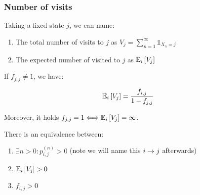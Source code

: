  \begin{frame} \frametitle{Number of visits}
    \vspace{2em}
    
    \begin{definition}
    Taking a fixed state $j$, we can name:
    \begin{enumerate}
     \item The total number of visits to $j$  as $V_j = \sum_{n = 1}^{\infty} \mathds{1}_{X_n = j}$
     \item The expected number of visited to $j$  as $\mathbb{E}_i\left[{V_j}\right]$
    \end{enumerate}
    \end{definition}
    
    \begin{proposition}
    If $f_{j,j} \neq 1$, we have:

    \[
    \mathbb{E}_i\left[{V_j}\right] = \frac{f_{i,j}}{1 - f_{j,j}}
    \]

    Moreover, it holds $f_{j, j} = 1 \Longleftrightarrow \mathbb{E}_i\left[{V_j}\right] = \infty$.
    \end{proposition}
    
    \begin{proposition}
    There is an equivalence between:
    \begin{enumerate}
    \item \(\exists n >0 : p_{i,j}^{(n)} > 0\) (note we will name this \(i \rightarrow j\) afterwards)
    \item \(\mathbb{E}_i\left[{V_j}\right] > 0\)
    \item \(f_{i,j} > 0\)
    \end{enumerate}
    \end{proposition}

 \end{frame}

